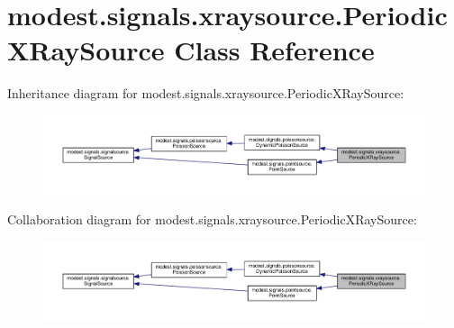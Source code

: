 \hypertarget{classmodest_1_1signals_1_1xraysource_1_1PeriodicXRaySource}{}\section{modest.\+signals.\+xraysource.\+Periodic\+X\+Ray\+Source Class Reference}
\label{classmodest_1_1signals_1_1xraysource_1_1PeriodicXRaySource}


Inheritance diagram for modest.\+signals.\+xraysource.\+Periodic\+X\+Ray\+Source\+:\nopagebreak
\begin{figure}[H]
\begin{center}
\leavevmode
\includegraphics[width=350pt]{classmodest_1_1signals_1_1xraysource_1_1PeriodicXRaySource__inherit__graph}
\end{center}
\end{figure}


Collaboration diagram for modest.\+signals.\+xraysource.\+Periodic\+X\+Ray\+Source\+:\nopagebreak
\begin{figure}[H]
\begin{center}
\leavevmode
\includegraphics[width=350pt]{classmodest_1_1signals_1_1xraysource_1_1PeriodicXRaySource__coll__graph}
\end{center}
\end{figure}
